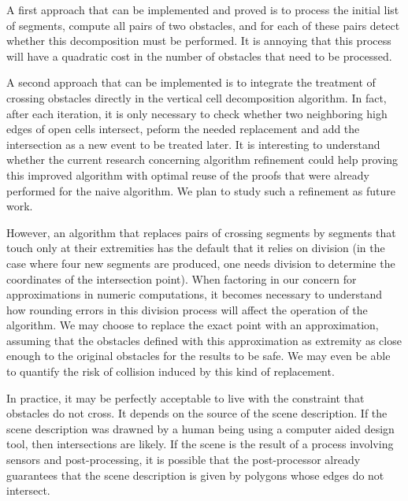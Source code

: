 \documentclass[a4paper, USenglish, cleveref, autoref, thm-restate]{lipics-v2021}
\begin{document}
A first approach that can be implemented and
proved is to process the initial list of segments, compute all pairs
of two obstacles, and for each of these pairs detect whether this
decomposition must be performed.  It is annoying that this process
will have a quadratic cost in the number of obstacles that need to be
processed.

A second approach that can be implemented is to integrate the
treatment of crossing obstacles directly in the vertical cell
decomposition algorithm.  In fact, after each iteration, it is only
necessary to check whether two neighboring high edges of open cells
intersect, peform the needed replacement and add the intersection as a
new event to be treated later.  It is interesting to understand
whether the current research concerning algorithm refinement could
help proving this improved algorithm with optimal reuse of the proofs
that were already performed for the naive algorithm.  We plan to study
such a refinement as future work.

However, an algorithm that replaces pairs of crossing segments by
segments that touch only at their extremities has the default that it
relies on division (in the case where four new segments are produced,
one needs division to determine the coordinates of
the intersection point).  When factoring in our concern for
approximations in numeric computations, it becomes necessary to understand how
rounding errors in this division process will affect the operation of
the algorithm.  We may choose to replace the exact point with an
approximation, assuming that the obstacles defined with this
approximation as extremity as close enough to the original obstacles
for the results to be safe.  We may even be able to quantify the risk
of collision induced by this kind of replacement.

In practice, it may be perfectly acceptable to live with the
constraint that obstacles do not cross.  It depends on the source of
the scene description.  If the scene description was drawned by a
human being using a computer aided design tool, then intersections are
likely.  If the scene is the result of a process involving sensors and
post-processing, it is possible that the post-processor already
guarantees that the scene description is given by polygons whose edges
do not intersect.
\end{document}

